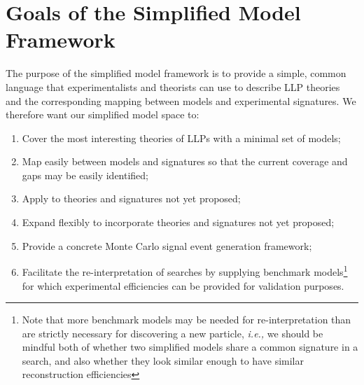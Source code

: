 \section{Goals of the Simplified Model Framework}
The purpose of the simplified model framework is to provide a simple, common language that experimentalists and theorists can use to describe LLP theories and the corresponding mapping between models and experimental signatures. We therefore want our simplified model space to:
%
\begin{enumerate}
\item Cover the most interesting theories of LLPs with a minimal set of models;
\item Map easily between models and signatures so that the current coverage and gaps may be easily identified;
\item Apply to theories and signatures not yet proposed;
\item Expand flexibly to incorporate theories and signatures not yet proposed;
\item Provide a concrete Monte Carlo signal event generation framework;
\item Facilitate the re-interpretation of searches by supplying benchmark models\footnote{Note that more benchmark models may be needed for re-interpretation than are strictly necessary for discovering a new particle, \emph{i.e.,} we should be mindful both of whether two simplified models share a common signature in a search, and also whether they look similar enough to have similar reconstruction efficiencies} for which experimental efficiencies can be provided for validation purposes.
\end{enumerate}

